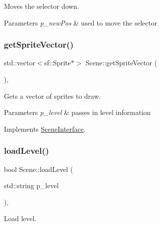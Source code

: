 Moves the selector down. 


\begin{DoxyParams}{Parameters}
{\em p\+\_\+new\+Pos} & used to move the selector \\
\hline
\end{DoxyParams}
\mbox{\label{class_scene_a595b66ffbd3efe4a0dd40f704a84c378}} 
\subsubsection{\texorpdfstring{get\+Sprite\+Vector()}{getSpriteVector()}}
{\footnotesize\ttfamily std\+::vector$<$sf\+::\+Sprite$\ast$$>$ Scene\+::get\+Sprite\+Vector (\begin{DoxyParamCaption}{ }\end{DoxyParamCaption})\hspace{0.3cm}{\ttfamily [override]}, {\ttfamily [virtual]}}



Gets a vector of sprites to draw. 


\begin{DoxyParams}{Parameters}
{\em p\+\_\+level} & passes in level information \\
\hline
\end{DoxyParams}


Implements \mbox{\hyperlink{class_scene_interface_af4cdfa0df6cbbba34d66870ea83b2a0a}{Scene\+Interface}}.

\mbox{\label{class_scene_a27a8b36b21dd9475d47c13db8cfdae64}} 
\subsubsection{\texorpdfstring{load\+Level()}{loadLevel()}}
{\footnotesize\ttfamily bool Scene\+::load\+Level (\begin{DoxyParamCaption}\item[{std\+::string}]{p\+\_\+level }\end{DoxyParamCaption})\hspace{0.3cm}{\ttfamily [override]}, {\ttfamily [virtual]}}



Load level. 


